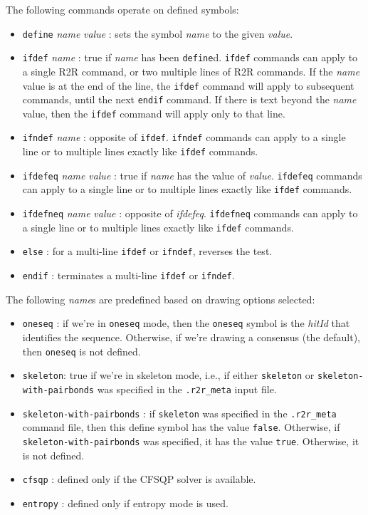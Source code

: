 \documentclass[letterpaper,12pt]{report}
\newcommand{\comment}[1]{}
\begin{document}
The following commands operate on defined symbols:
\begin{itemize}
\item {\tt define} {\it name} {\it value} : sets the symbol {\it name} to the given {\it value}.
\item {\tt ifdef} {\it name} : true if {\it name} has been {\tt define}d.
{\tt ifdef} commands can apply to a single R2R command, or two multiple lines of R2R commands.
If the {\it name} value is at the end of the line, the {\tt ifdef} command will apply to subsequent commands, until
the next {\tt endif} command.  If there is text beyond the {\it name} value, then the {\tt ifdef} command will apply only to
that line.
\item {\tt ifndef} {\it name} : opposite of {\tt ifdef}.
{\tt ifndef} commands can apply to a single line or to multiple lines exactly like {\tt ifdef} commands.
\item {\tt ifdefeq} {\it name} {\it value} : true if {\it name} has the value of {\it value}.
{\tt ifdefeq} commands can apply to a single line or to multiple lines exactly like {\tt ifdef} commands.
\item {\tt ifdefneq} {\it name} {\it value} : opposite of {\it ifdefeq}.
{\tt ifdefneq} commands can apply to a single line or to multiple lines exactly like {\tt ifdef} commands.
\item {\tt else} : for a multi-line {\tt ifdef} or {\tt ifndef}, reverses the test.
\item {\tt endif} : terminates a multi-line {\tt ifdef} or {\tt ifndef}.
\end{itemize}

The following {\it name}s are predefined based on drawing options selected:
\begin{itemize}
\item {\tt oneseq} : if we're in {\tt oneseq} mode, then the {\tt oneseq} symbol is the {\it hitId} that identifies the sequence.
Otherwise, if we're drawing a consensus (the default), then {\tt oneseq} is not defined.
\item {\tt skeleton}: true if we're in skeleton mode, i.e., if either {\tt skeleton} or {\tt skeleton-with-pairbonds} was specified in the {\tt .r2r\_meta} input file.
\item {\tt skeleton-with-pairbonds} : if {\tt skeleton} was specified in the {\tt .r2r\_meta} command file, then this define symbol has the value {\tt false}.  Otherwise, if {\tt skeleton-with-pairbonds} was specified, it has the value {\tt true}.  Otherwise, it is not defined.
\item {\tt cfsqp} : defined only if the CFSQP solver is available.
\item {\tt entropy} : defined only if entropy mode is used.
\comment{
\item {\tt layout} : This symbol is not defined in advance, but is used by the {\tt set\_layout} command below.  However, this command is deprecated.
}
\end{itemize}
\end{document}
